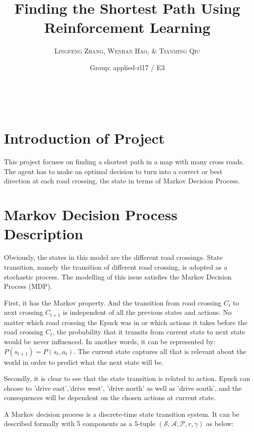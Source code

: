 \documentclass[a4paper, 11pt]{article} %
\title{\textbf{Finding the Shortest Path Using Reinforcement Learning}} %
\author{\textsc{Lingfeng Zhang, Wenhan Hao, $\&$ Tianming Qiu} %
\\{\textit{}}} %
\date{Group: applied-rl17 / E3} %
\makeatletter
\renewcommand{\maketitle}{ %
\begin{flushright} %
{\LARGE\@title} %

\vspace{50pt} %

{\large\@author} %
\\\@date %

\vspace{40pt} %
\end{flushright}
}
\makeatother
\begin{document}
\maketitle %




\section{Introduction of Project}
This project focuses on finding a shortest path in a map with many cross roads. The agent has to make an optimal decision to turn into a correct or best direction at each road crossing, the state in terms of Markov Decision Process.


\section{Markov Decision Process Description}

Obviously, the states in this model are the different road crossings. State transition, namely the transition of different road crossing, is adopted as a stochastic process. The modelling of this issue satisfies the Markov Decision Process (MDP).
 
First, it has the Markov property. And the transition from road crossing $C_{t}$ to next crossing $C_{t+1}$ is independent of all the previous states and actions. No matter which road crossing the Epuck was in or which actions it takes before the road crossing $C_{t}$, the probability that it transits from current state to next state would be never influenced. In another words, it can be represented by: $P(s_{t+1})=P(s_{t},a_{t})$. The current state captures all that is relevant about the world in order to predict what the next state will be.

Secondly, it is clear to see that the state transition is related to action. Epuck can choose to 'drive east','drive west', 'drive north' as well as 'drive south', and the consequences will be dependent on the chosen actions at current state. 

A Markov decision process is a discrete-time state transition system. It can be described formally with 5 components as a 5-tuple $(\mathcal{S,A,P}, r,\gamma)$ as below:
\end{document}
